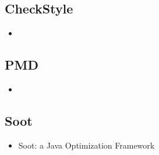 \subsection{CheckStyle}
\begin{itemize}
\item \cite{existingtools:checkstyle}
\end{itemize}

\subsection{PMD}
\begin{itemize}
\item \cite{existingtools:pmd}
\end{itemize}

\subsection{Soot}
\begin{itemize}
\item Soot: a Java Optimization Framework \cite{existingtools:soot}
\end{itemize}
